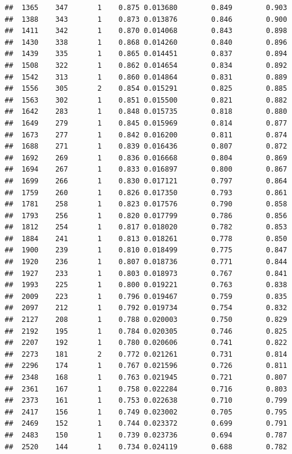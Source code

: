 \documentclass[]{article}
\numberwithin{figure}{section}
\numberwithin{table}{section}
\theoremstyle{definition}
\theoremstyle{definition}
\theoremstyle{definition}
\theoremstyle{remark}
\begin{document}
\begin{verbatim}
##  1365    347       1    0.875 0.013680        0.849        0.903
##  1388    343       1    0.873 0.013876        0.846        0.900
##  1411    342       1    0.870 0.014068        0.843        0.898
##  1430    338       1    0.868 0.014260        0.840        0.896
##  1439    335       1    0.865 0.014451        0.837        0.894
##  1508    322       1    0.862 0.014654        0.834        0.892
##  1542    313       1    0.860 0.014864        0.831        0.889
##  1556    305       2    0.854 0.015291        0.825        0.885
##  1563    302       1    0.851 0.015500        0.821        0.882
##  1642    283       1    0.848 0.015735        0.818        0.880
##  1649    279       1    0.845 0.015969        0.814        0.877
##  1673    277       1    0.842 0.016200        0.811        0.874
##  1688    271       1    0.839 0.016436        0.807        0.872
##  1692    269       1    0.836 0.016668        0.804        0.869
##  1694    267       1    0.833 0.016897        0.800        0.867
##  1699    266       1    0.830 0.017121        0.797        0.864
##  1759    260       1    0.826 0.017350        0.793        0.861
##  1781    258       1    0.823 0.017576        0.790        0.858
##  1793    256       1    0.820 0.017799        0.786        0.856
##  1812    254       1    0.817 0.018020        0.782        0.853
##  1884    241       1    0.813 0.018261        0.778        0.850
##  1900    239       1    0.810 0.018499        0.775        0.847
##  1920    236       1    0.807 0.018736        0.771        0.844
##  1927    233       1    0.803 0.018973        0.767        0.841
##  1993    225       1    0.800 0.019221        0.763        0.838
##  2009    223       1    0.796 0.019467        0.759        0.835
##  2097    212       1    0.792 0.019734        0.754        0.832
##  2127    208       1    0.788 0.020003        0.750        0.829
##  2192    195       1    0.784 0.020305        0.746        0.825
##  2207    192       1    0.780 0.020606        0.741        0.822
##  2273    181       2    0.772 0.021261        0.731        0.814
##  2296    174       1    0.767 0.021596        0.726        0.811
##  2348    168       1    0.763 0.021945        0.721        0.807
##  2361    167       1    0.758 0.022284        0.716        0.803
##  2373    161       1    0.753 0.022638        0.710        0.799
##  2417    156       1    0.749 0.023002        0.705        0.795
##  2469    152       1    0.744 0.023372        0.699        0.791
##  2483    150       1    0.739 0.023736        0.694        0.787
##  2520    144       1    0.734 0.024119        0.688        0.782

\end{verbatim}
\end{document}
